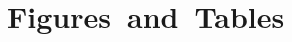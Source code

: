 \documentclass[
	ruledheaders=section,%
	class=report,%
	thesis={type=bachelor},%
	accentcolor=1c,%
	custommargins=false,%
	marginpar=false,%
	parskip=half-,%
	fontsize=11pt,%
	instbox=false,
	IMRAD=false,
]{tudapub}
\newcommand{\content}{%
}
\begin{document}
	

	
	\tableofcontents
	
	\chapter*{Figures~and~Tables}
	\begingroup                               %
	\let\clearpage\relax
	\listoffigures\listoftables
	\endgroup
	
	
    
    
	
	
	\content                                  %
	
	\cleardoublepage
	
	
	\cleardoublepage
	\appendix            %
\end{document}

